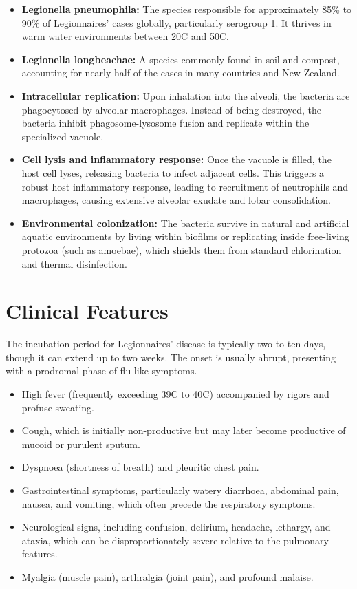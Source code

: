 \begin{itemize}
    \item \textbf{Legionella pneumophila:} The species responsible for approximately 85\% to 90\% of Legionnaires' cases globally, particularly serogroup 1. It thrives in warm water environments between 20\textdegree C and 50\textdegree C.
    \item \textbf{Legionella longbeachae:} A species commonly found in soil and compost, accounting for nearly half of the cases in many countries and New Zealand.
    \item \textbf{Intracellular replication:} Upon inhalation into the alveoli, the bacteria are phagocytosed by alveolar macrophages. Instead of being destroyed, the bacteria inhibit phagosome-lysosome fusion and replicate within the specialized vacuole.
    \item \textbf{Cell lysis and inflammatory response:} Once the vacuole is filled, the host cell lyses, releasing bacteria to infect adjacent cells. This triggers a robust host inflammatory response, leading to recruitment of neutrophils and macrophages, causing extensive alveolar exudate and lobar consolidation.
    \item \textbf{Environmental colonization:} The bacteria survive in natural and artificial aquatic environments by living within biofilms or replicating inside free-living protozoa (such as amoebae), which shields them from standard chlorination and thermal disinfection.
\end{itemize}

\section*{Clinical Features}
The incubation period for Legionnaires' disease is typically two to ten days, though it can extend up to two weeks. The onset is usually abrupt, presenting with a prodromal phase of flu-like symptoms.

\begin{itemize}
    \item High fever (frequently exceeding 39\textdegree C to 40\textdegree C) accompanied by rigors and profuse sweating.
    \item Cough, which is initially non-productive but may later become productive of mucoid or purulent sputum.
    \item Dyspnoea (shortness of breath) and pleuritic chest pain.
    \item Gastrointestinal symptoms, particularly watery diarrhoea, abdominal pain, nausea, and vomiting, which often precede the respiratory symptoms.
    \item Neurological signs, including confusion, delirium, headache, lethargy, and ataxia, which can be disproportionately severe relative to the pulmonary features.
    \item Myalgia (muscle pain), arthralgia (joint pain), and profound malaise.
\end{itemize}

